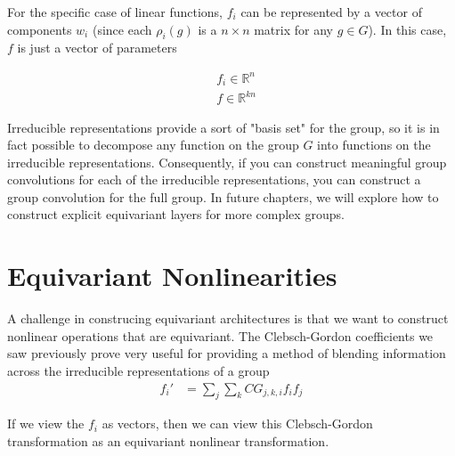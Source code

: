 \documentclass[book.tex]{subfiles}
\begin{document}
For the specific case of linear functions, $f_i$ can be represented by a vector of components $w_i$ (since each $\rho_i(g)$ is a $n \times n$ matrix for any $g \in G$). In this case, $f$ is just a vector of parameters

\begin{align}
&f_i \in \mathbb{R}^{n} \\
&f \in \mathbb{R}^{kn}
\end{align}

Irreducible representations provide a sort of "basis set" for the group, so it is in fact possible to decompose any function on the group $G$ into functions on the irreducible representations. Consequently, if you can construct meaningful group convolutions for each of the irreducible representations, you can construct a group convolution for the full group. In future chapters, we will explore how to construct explicit equivariant layers for more complex groups.

\section{Equivariant Nonlinearities}

A challenge in construcing equivariant architectures is that we want to construct nonlinear operations that are equivariant. The Clebsch-Gordon coefficients we saw previously prove very useful for providing a method of blending information across the irreducible representations of a group
\begin{align}
f_i' &= \sum_j \sum_k CG_{j,k,i} f_i f_j
\end{align}

If we view the $f_i$ as vectors, then we can view this Clebsch-Gordon transformation as an equivariant nonlinear transformation.


\end{document}
